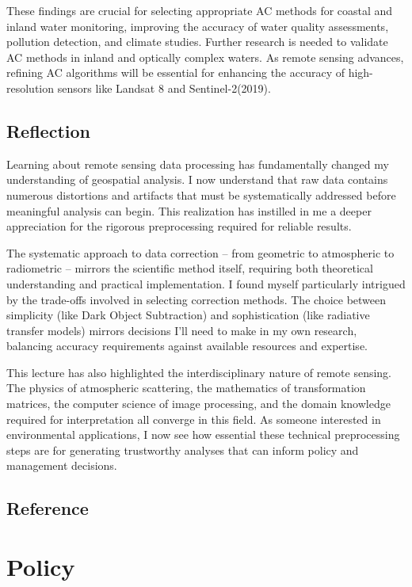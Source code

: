 \documentclass[
  letterpaper,
]{scrbook}
\begin{document}
These findings are crucial for selecting appropriate AC methods for
coastal and inland water monitoring, improving the accuracy of water
quality assessments, pollution detection, and climate studies. Further
research is needed to validate AC methods in inland and optically
complex waters. As remote sensing advances, refining AC algorithms will
be essential for enhancing the accuracy of high-resolution sensors like
Landsat 8 and Sentinel-2(2019).

\section{Reflection}\label{reflection-1}

Learning about remote sensing data processing has fundamentally changed
my understanding of geospatial analysis. I now understand that raw data
contains numerous distortions and artifacts that must be systematically
addressed before meaningful analysis can begin. This realization has
instilled in me a deeper appreciation for the rigorous preprocessing
required for reliable results.

The systematic approach to data correction -- from geometric to
atmospheric to radiometric -- mirrors the scientific method itself,
requiring both theoretical understanding and practical implementation. I
found myself particularly intrigued by the trade-offs involved in
selecting correction methods. The choice between simplicity (like Dark
Object Subtraction) and sophistication (like radiative transfer models)
mirrors decisions I'll need to make in my own research, balancing
accuracy requirements against available resources and expertise.

This lecture has also highlighted the interdisciplinary nature of remote
sensing. The physics of atmospheric scattering, the mathematics of
transformation matrices, the computer science of image processing, and
the domain knowledge required for interpretation all converge in this
field. As someone interested in environmental applications, I now see
how essential these technical preprocessing steps are for generating
trustworthy analyses that can inform policy and management decisions.

\section{Reference}\label{reference-1}


\chapter{Policy}\label{policy}
\end{document}
